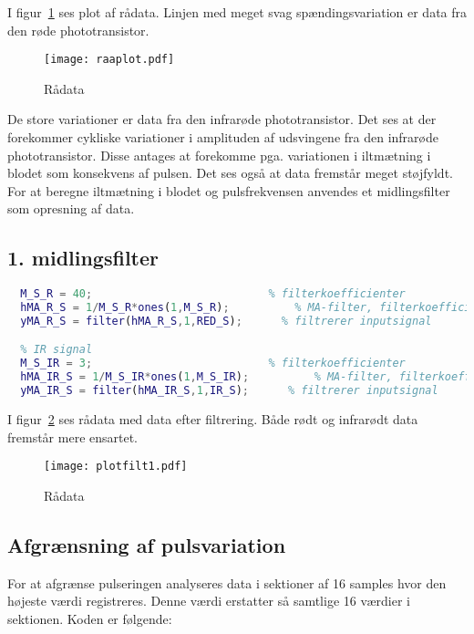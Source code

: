 \documentclass{article}
\begin{document}
I figur~\ref{fig:raaplot} ses plot af rådata. Linjen med meget svag spændingsvariation er data fra den røde phototransistor.
\clearpage
\begin{figure}[h]
  \centering
  \texttt{[image: raaplot.pdf]}
  \caption{Rådata}
  \label{fig:raaplot}
\end{figure}

De store variationer er data fra den infrarøde phototransistor. Det ses at der forekommer cykliske variationer i amplituden af udsvingene fra den infrarøde phototransistor. Disse antages at forekomme pga. variationen i iltmætning i blodet som konsekvens af pulsen. Det ses også at data fremstår meget støjfyldt. For at beregne iltmætning i blodet og pulsfrekvensen anvendes et midlingsfilter som opresning af data. 

\subsection{1. midlingsfilter}
\label{sec:forste-midl-filt}

\begin{lstlisting}[language=Matlab,basicstyle=\tiny]
  % rødt signal
  M_S_R = 40;                           % filterkoefficienter
  hMA_R_S = 1/M_S_R*ones(1,M_S_R);          % MA-filter, filterkoefficienter
  yMA_R_S = filter(hMA_R_S,1,RED_S);      % filtrerer inputsignal

  % IR signal
  M_S_IR = 3;                           % filterkoefficienter
  hMA_IR_S = 1/M_S_IR*ones(1,M_S_IR);          % MA-filter, filterkoefficienter
  yMA_IR_S = filter(hMA_IR_S,1,IR_S);      % filtrerer inputsignal
\end{lstlisting}

I figur~\ref{fig:plotfilt1} ses rådata med data efter filtrering. Både rødt og infrarødt data fremstår mere ensartet.
\begin{figure}[h]
  \centering
  \texttt{[image: plotfilt1.pdf]}
  \caption{Rådata}
  \label{fig:plotfilt1}
\end{figure}

\subsection{Afgrænsning af pulsvariation}
\label{sec:afgr-af-pulsv}

For at afgrænse pulseringen analyseres data i sektioner af 16 samples hvor den højeste værdi registreres. Denne værdi erstatter så samtlige 16 værdier i sektionen. Koden er følgende:
\end{document}
